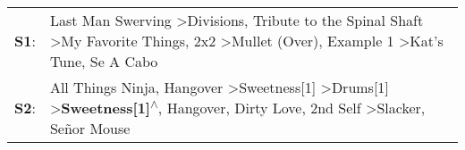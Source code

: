 \begin{supertabular}{p{0.03\textwidth}p{0.92\textwidth}}
 \textbf{S1}:  &                                 Last Man Swerving\textsuperscript{} \textgreater \enspace Divisions\textsuperscript{}, \enspace Tribute to the Spinal Shaft\textsuperscript{} \textgreater \enspace My Favorite Things\textsuperscript{}, \enspace 2x2\textsuperscript{} \textgreater \enspace Mullet (Over)\textsuperscript{}, \enspace Example 1\textsuperscript{} \textgreater \enspace Kat's Tune\textsuperscript{}, \enspace Se A Cabo\textsuperscript{}  \enspace  \\
 \textbf{S2}:  &  All Things Ninja\textsuperscript{}, \enspace Hangover\textsuperscript{} \textgreater \enspace Sweetness[1]\textsuperscript{} \textgreater \enspace Drums[1]\textsuperscript{} \textgreater \enspace \textbf{Sweetness[1]\textsuperscript{$\wedge$}}, \enspace Hangover\textsuperscript{}, \enspace Dirty Love\textsuperscript{}, \enspace 2nd Self\textsuperscript{} \textgreater \enspace Slacker\textsuperscript{}, \enspace Señor Mouse\textsuperscript{}  \enspace  \\
\end{supertabular}
